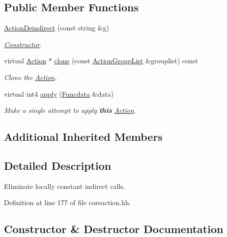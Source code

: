 \subsection*{Public Member Functions}
\begin{DoxyCompactItemize}
\item 
\mbox{\hyperlink{class_action_deindirect_aaf631db039ca1c1ce5b029620b95a633}{Action\+Deindirect}} (const string \&g)
\begin{DoxyCompactList}\small\item\em \mbox{\hyperlink{class_constructor}{Constructor}}. \end{DoxyCompactList}\item 
virtual \mbox{\hyperlink{class_action}{Action}} $\ast$ \mbox{\hyperlink{class_action_deindirect_ae0d7981c40e1af3c554a2229dc8c44ab}{clone}} (const \mbox{\hyperlink{class_action_group_list}{Action\+Group\+List}} \&grouplist) const
\begin{DoxyCompactList}\small\item\em Clone the \mbox{\hyperlink{class_action}{Action}}. \end{DoxyCompactList}\item 
virtual int4 \mbox{\hyperlink{class_action_deindirect_a4f54f89989ab5700bdac440960ed6fcf}{apply}} (\mbox{\hyperlink{class_funcdata}{Funcdata}} \&data)
\begin{DoxyCompactList}\small\item\em Make a single attempt to apply {\bfseries{this}} \mbox{\hyperlink{class_action}{Action}}. \end{DoxyCompactList}\end{DoxyCompactItemize}
\subsection*{Additional Inherited Members}


\subsection{Detailed Description}
Eliminate locally constant indirect calls. 

Definition at line 177 of file coreaction.\+hh.



\subsection{Constructor \& Destructor Documentation}
\mbox{\label{class_action_deindirect_aaf631db039ca1c1ce5b029620b95a633}} 
